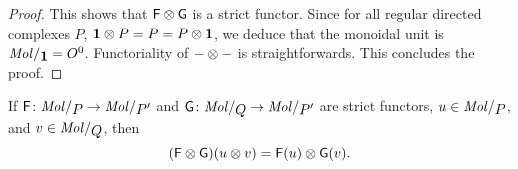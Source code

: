 \begin{proof}
    This shows that \( \mathsf{F} \otimes \mathsf{G} \) is a strict functor.
    Since for all regular directed complexes \( P \), \( \mathbf{1} \otimes P = P = P \otimes \mathbf{1} \), we deduce that the monoidal unit is \( \molecin{\pt} = \globe{0} \).
    Functoriality of \( - \otimes - \) is straightforwards.
    This concludes the proof.
\end{proof}

\begin{rmk}
    If \( \F \colon \molecin{P} \to \molecin{P'} \) and \( \G \colon \molecin{Q} \to \molecin{P'} \) are strict functors, \( u \in \molecin{P} \), and \( v \in \molecin{Q} \), then 
    \begin{equation*}
       (\mathsf{F} \otimes \mathsf{G})(u \otimes v) = \mathsf{F}(u) \otimes \mathsf{G}(v). 
    \end{equation*}
\end{rmk}

